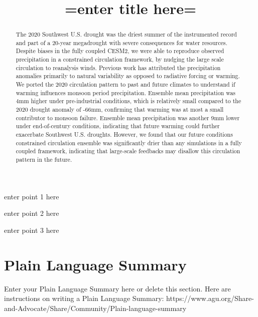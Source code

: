 \documentclass[draft]{agujournal2019}
\begin{document}
\title{=enter title here=}










\begin{keypoints}
\item enter point 1 here
\item enter point 2 here
\item enter point 3 here
\end{keypoints}



\begin{abstract}
The 2020 Southwest U.S. drought was the driest summer of the instrumented record and part of a 20-year megadrought with severe consequences for water resources. Despite biases in the fully coupled CESM2, we were able to reproduce observed precipitation in a constrained circulation framework, by nudging the large scale circulation to reanalysis winds. Previous work has attributed the precipitation anomalies primarily to natural variability as opposed to radiative forcing or warming. We ported the 2020 circulation pattern to past and future climates to understand if warming influences monsoon period precipitation. Ensemble mean precipitation was 4mm higher under pre-industrial conditions, which is relatively small compared to the 2020 drought anomaly of -66mm, confirming that warming was at most a small contributor to monsoon failure. Ensemble mean precipitation was another 9mm lower under end-of-century conditions, indicating that future warming could further exacerbate Southwest U.S. droughts. However, we found that our future conditions constrained circulation ensemble was significantly drier than any simulations in a fully coupled framework, indicating that large-scale feedbacks may disallow this circulation pattern in the future.
\end{abstract}

\section*{Plain Language Summary}
Enter your Plain Language Summary here or delete this section.
Here are instructions on writing a Plain Language Summary: 
https://www.agu.org/Share-and-Advocate/Share/Community/Plain-language-summary
\end{document}
